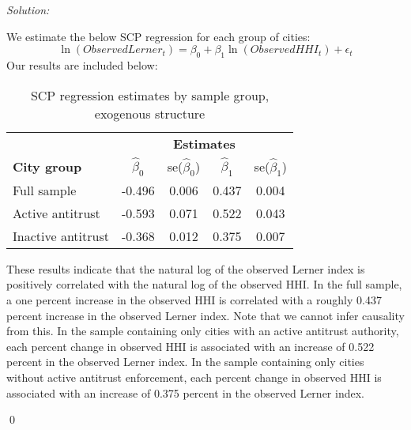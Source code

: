 \documentclass[12pt]{article}
\newenvironment{problem}[2][Problem]{\begin{trivlist}
\item[\hskip \labelsep {\bfseries #1}\hskip \labelsep {\bfseries #2.}]}{\end{trivlist}}
\newenvironment{sol}
    {\emph{Solution:}
    }
    {
    \qed
    }
\begin{document}
\begin{problem}{2}
\end{problem}
\begin{sol}
   We estimate the below SCP regression for each group of cities:
    \[\ln(ObservedLerner_t) = \beta_0 + \beta_1 \ln(ObservedHHI_t) + \epsilon_t\]
    Our results are included below:
    \begin{table}[!ht] %
      \centering %
      \begin{tabular}{l c c c c} %
      \toprule %
      & \multicolumn{4}{c}{\textbf{Estimates}} \\ %
      \cmidrule(l){2-5} %
      \textbf{City group} & $\hat{\beta}_0$ & se($\hat{\beta}_0$) & $\hat{\beta}_1$ & se($\hat{\beta}_1$)\\ %
      \midrule %
      Full sample & -0.496 & 0.006 & 0.437 & 0.004 \\ %
      Active antitrust & -0.593 & 0.071 & 0.522 & 0.043 \\ %
      Inactive antitrust & -0.368 & 0.012 & 0.375 & 0.007 \\ %
      \bottomrule %
      \end{tabular}
      \caption{SCP regression estimates by sample group, exogenous structure} %
      \label{tab:reg_table} %
      \end{table}
      These results indicate that the natural log of the observed Lerner index is positively correlated with the natural log of the observed HHI. In the full sample, a one percent increase in the observed HHI is correlated with a roughly 0.437 percent increase in the observed Lerner index. Note that we cannot infer causality from this. In the sample containing only cities with an active antitrust authority, each percent change in observed HHI is associated with an increase of 0.522 percent in the observed Lerner index. In the sample containing only cities without active antitrust enforcement, each percent change in observed HHI is associated with an increase of 0.375 percent in the observed Lerner index. 


\end{sol}
\end{document}
